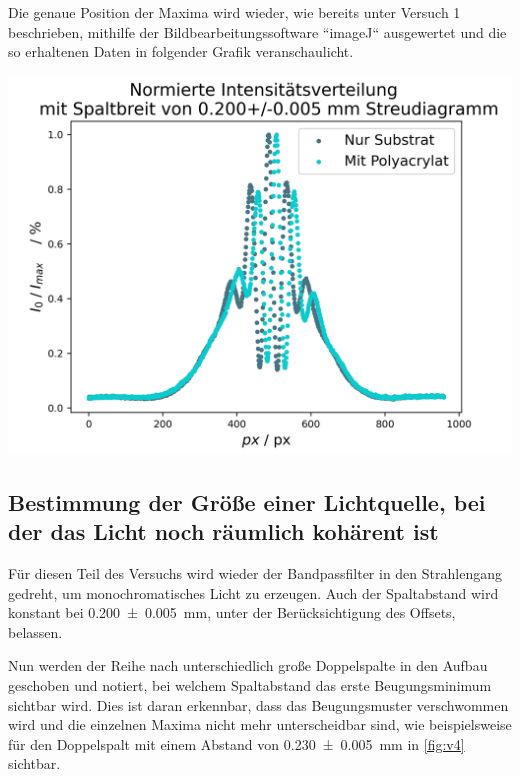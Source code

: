 \documentclass[11pt,ngerman]{scrartcl}
\begin{document}
\noindent Die genaue Position der Maxima wird wieder, wie bereits unter Versuch 1 beschrieben, mithilfe der Bildbearbeitungssoftware ``imageJ`` ausgewertet und die so erhaltenen Daten in folgender Grafik veranschaulicht.

\begin{center}
	\begin{minipage}[t]{0.7\textwidth}
		\includegraphics[width=\textwidth]{auswertung/sprung_gesamt}
		\label{fig:sprung_ges}
	\end{minipage}
\end{center}



\subsection{Bestimmung der Größe einer Lichtquelle, bei der das Licht noch räumlich kohärent ist}

Für diesen Teil des Versuchs wird wieder der Bandpassfilter in den Strahlengang gedreht, um monochromatisches Licht zu erzeugen. Auch der Spaltabstand wird konstant bei \SI{0.200(5)}{mm}, unter der Berücksichtigung des Offsets, belassen.

\vspace{2mm}

\noindent Nun werden der Reihe nach unterschiedlich große Doppelspalte in den Aufbau geschoben und notiert, bei welchem Spaltabstand das erste Beugungsminimum sichtbar wird. Dies ist daran erkennbar, dass das Beugungsmuster verschwommen wird und die einzelnen Maxima nicht mehr unterscheidbar sind, wie beispielsweise für den Doppelspalt mit einem Abstand von \SI{0.230(5)}{mm} in \autoref{fig:v4} sichtbar.
\end{document}
